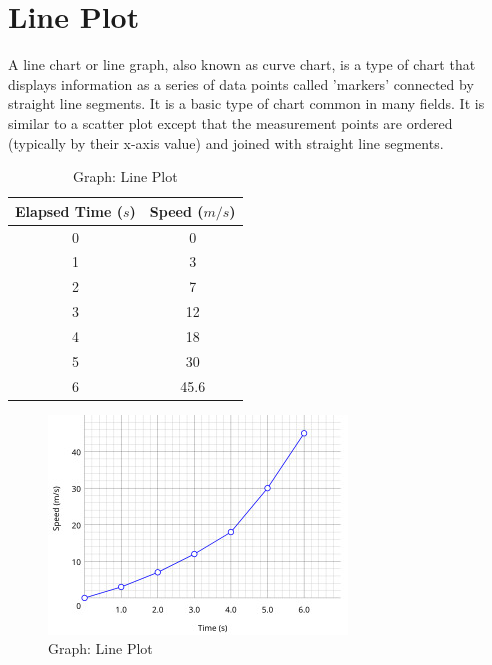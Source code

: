 \section{Line Plot \cite{wiki-line-chart}}\label{plot_line}
A line chart or line graph, also known as curve chart, is a type of chart that displays information as a series of data points called 'markers' connected by straight line segments. It is a basic type of chart common in many fields. It is similar to a scatter plot except that the measurement points are ordered (typically by their x-axis value) and joined with straight line segments. 


\begin{table}[H]
    \begin{minipage}{0.45\textwidth}
        \centering
        \begin{tabular}{|c|c|}
            \hline
            Elapsed Time ($s$) & Speed ($m/s$) \\ \hline
            0 & 0 \\ \hline
            1 & 3 \\ \hline
            2 & 7 \\ \hline
            3 & 12 \\ \hline
            4 & 18 \\ \hline
            5 & 30 \\ \hline
            6 & 45.6 \\ \hline
        \end{tabular}
        \caption{Data: Line Plot}
    \end{minipage}
    \hfill
    \begin{minipage}{0.45\textwidth}
        \begin{figure}[H]
            \includegraphics[width=\linewidth]{Pictures/data/data_line_chart.jpg}
            \caption{Graph: Line Plot}
        \end{figure}
    \end{minipage}
\end{table}

